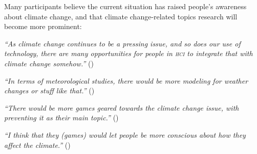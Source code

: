     Many participants believe the current situation has raised people's awareness about climate change, and that climate change-related topics research will become more prominent:
    
    \begin{quoting}
        \textit{``As climate change continues to be a pressing issue, and so does our use of technology, there are many opportunities for people in \textsc{hci} to integrate that with climate change somehow.''} ()
    \end{quoting}
    
    \begin{quoting}
        \textit{``In terms of meteorological studies, there would be more modeling for weather changes or stuff like that.''} ()
    \end{quoting}
    
    \begin{quoting}
        \textit{``There would be more games geared towards the climate change issue, with preventing it as their main topic.''} ()
    \end{quoting}
    
    \begin{quoting}
        \textit{``I think that they (games) would let people be more conscious about how they affect the climate.''} ()
    \end{quoting}
    
    
